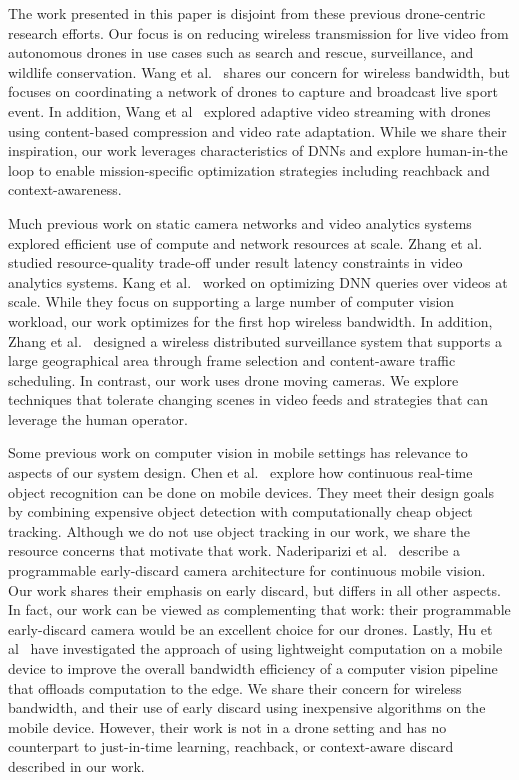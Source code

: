 The work presented in this paper is disjoint from these previous drone-centric
research efforts. Our focus is on reducing wireless transmission for live video
from autonomous drones in use cases such as search and rescue, surveillance, and
wildlife conservation. Wang et al.~\cite{Wang2017networked} shares our concern
for wireless bandwidth, but focuses on coordinating a network of drones to
capture and broadcast live sport event. In addition, Wang et
al~\cite{Wang2016skyeyes} explored adaptive video streaming with drones using
content-based compression and video rate adaptation. While we share their
inspiration, our work leverages characteristics of DNNs and explore human-in-the
loop to enable mission-specific optimization strategies including reachback and
context-awareness.

Much previous work on static camera networks and video analytics systems
explored efficient use of compute and network resources at scale. Zhang et
al.~\cite{zhang2017live} studied resource-quality trade-off under result latency
constraints in video analytics systems. Kang et al.~\cite{kang2017noscope} worked
on optimizing DNN queries over videos at scale. While they focus on supporting a
large number of computer vision workload, our work optimizes for the first hop
wireless bandwidth. In addition, Zhang et al.~\cite{zhang2015design} designed a
wireless distributed surveillance system that supports a large geographical area
through frame selection and content-aware traffic scheduling. In contrast, our
work uses drone moving cameras. We explore techniques that tolerate changing
scenes in video feeds and strategies that can leverage the human operator.

Some previous work on computer vision in mobile settings has relevance to
aspects of our system design.  Chen et al.~\cite{chen2015glimpse} explore how
continuous real-time object recognition can be done on mobile devices. They meet
their design goals by combining expensive object detection with computationally
cheap object tracking.  Although we do not use object tracking in our work, we
share the resource concerns that motivate that work.  Naderiparizi et
al.~\cite{naderiparizi2017glimpse} describe a programmable early-discard camera
architecture for continuous mobile vision.  Our work shares their emphasis on
early discard, but differs in all other aspects.  In fact, our work can be
viewed as complementing that work: their programmable early-discard camera would
be an excellent choice for our drones. Lastly, Hu et al~\cite{Hu2015} have
investigated the approach of using lightweight computation on a mobile device to
improve the overall bandwidth efficiency of a computer vision pipeline that
offloads computation to the edge.  We share their concern for wireless
bandwidth, and their use of early discard using inexpensive algorithms on the
mobile device.  However, their work is not in a drone setting and has no
counterpart to just-in-time learning, reachback, or context-aware discard
described in our work.

